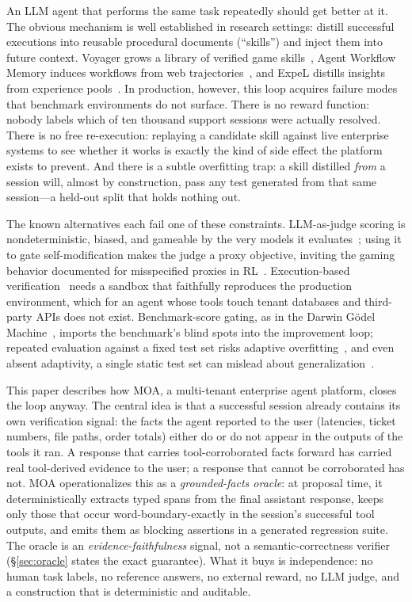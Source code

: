 \documentclass{article}
\newcommand{\moa}{MOA}
\begin{document}
An LLM agent that performs the same task repeatedly should get better at it. The obvious mechanism is well established in research settings: distill successful executions into reusable procedural documents (``skills'') and inject them into future context. Voyager grows a library of verified game skills~\citep{wang2023voyager}, Agent Workflow Memory induces workflows from web trajectories~\citep{wang2024awm}, and ExpeL distills insights from experience pools~\citep{zhao2023expel}. In production, however, this loop acquires failure modes that benchmark environments do not surface. There is no reward function: nobody labels which of ten thousand support sessions were actually resolved. There is no free re-execution: replaying a candidate skill against live enterprise systems to see whether it works is exactly the kind of side effect the platform exists to prevent. And there is a subtle overfitting trap: a skill distilled \emph{from} a session will, almost by construction, pass any test generated from that same session---a held-out split that holds nothing out.

The known alternatives each fail one of these constraints. LLM-as-judge scoring is nondeterministic, biased, and gameable by the very models it evaluates~\citep{zheng2023llmjudge, wang2023fairevaluators}; using it to gate self-modification makes the judge a proxy objective, inviting the gaming behavior documented for misspecified proxies in RL~\citep{pan2022rewardmisspec}. Execution-based verification~\citep{wang2023voyager, chen2022codet} needs a sandbox that faithfully reproduces the production environment, which for an agent whose tools touch tenant databases and third-party APIs does not exist. Benchmark-score gating, as in the Darwin G\"odel Machine~\citep{zhang2025dgm}, imports the benchmark's blind spots into the improvement loop; repeated evaluation against a fixed test set risks adaptive overfitting~\citep{blum2015ladder}, and even absent adaptivity, a single static test set can mislead about generalization~\citep{recht2019imagenet}.

This paper describes how \moa{}, a multi-tenant enterprise agent platform, closes the loop anyway. The central idea is that a successful session already contains its own verification signal: the facts the agent reported to the user (latencies, ticket numbers, file paths, order totals) either do or do not appear in the outputs of the tools it ran. A response that carries tool-corroborated facts forward has carried real tool-derived evidence to the user; a response that cannot be corroborated has not. \moa{} operationalizes this as a \emph{grounded-facts oracle}: at proposal time, it deterministically extracts typed spans from the final assistant response, keeps only those that occur word-boundary-exactly in the session's successful tool outputs, and emits them as blocking assertions in a generated regression suite. The oracle is an \emph{evidence-faithfulness} signal, not a semantic-correctness verifier (\S\ref{sec:oracle} states the exact guarantee). What it buys is independence: no human task labels, no reference answers, no external reward, no LLM judge, and a construction that is deterministic and auditable.
\end{document}
